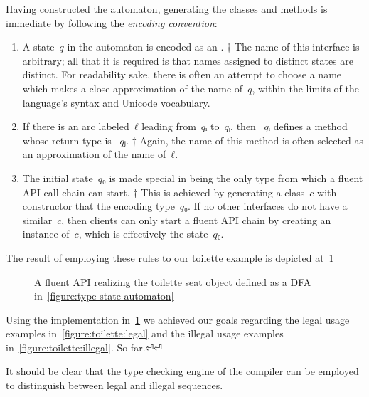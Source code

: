 Having constructed the automaton, generating the classes and methods is
immediate by following the \emph{encoding convention}:
\begin{enumerate}
  \item A state~$q$ in the automaton is encoded as an .%
        †{%
          The name of this interface is arbitrary; all that it is required is
          that names assigned to distinct states are distinct.  For readability
          sake, there is often an attempt to choose a name which makes a close
          approximation of the name of~$q$, within the limits of the language's
          syntax and Unicode vocabulary.
        }
  \item If there is an arc labeled~$ℓ$ leading from~$qᵢ$ to~$qⱼ$,
        then ~$qᵢ$ defines a
        method whose return type is ~$qⱼ$.%
        †{%
          Again, the name of this method is often selected as an approximation
          of the name of~$ℓ$.
        }
  \item The initial state~$q₀$ is made special in being the only type from
        which a fluent API call chain can start.%
        †{%
          This is achieved by generating a class~$c$ with 
          constructor that  the  encoding
          type~$q₀$.  If no other interfaces do not have a similar~$c$, then
          clients can only start a fluent API chain by creating an instance
          of~$c$, which is
          effectively the state~$q₀$.
        }
\end{enumerate}

The result of employing these rules to our toilette example is depicted
at~\cref{figure:toilette-types}

\begin{figure}[H]
  \caption{\label{figure:toilette-types}
    A fluent API realizing the toilette seat object defined as a DFA
    in~\cref{figure:type-state-automaton}}
\end{figure}

Using the implementation in~\cref{figure:toilette-types} we achieved
our goals regarding the legal usage examples in~\cref{figure:toilette:legal}
and the illegal usage examples in~\cref{figure:toilette:illegal}.
So far.⏎⏎

It should be clear that the type checking engine of the compiler can
be employed to distinguish between legal and illegal sequences.
